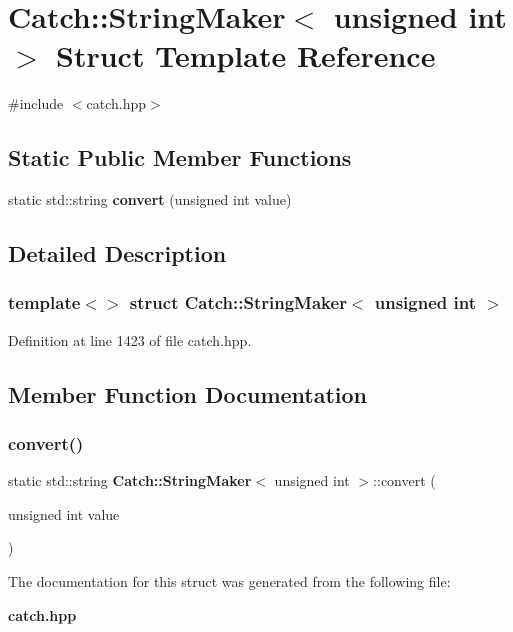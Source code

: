 \section{Catch\+::String\+Maker$<$ unsigned int $>$ Struct Template Reference}
\label{struct_catch_1_1_string_maker_3_01unsigned_01int_01_4}


{\ttfamily \#include $<$catch.\+hpp$>$}

\subsection*{Static Public Member Functions}
\begin{DoxyCompactItemize}
\item 
static std\+::string \textbf{ convert} (unsigned int value)
\end{DoxyCompactItemize}


\subsection{Detailed Description}
\subsubsection*{template$<$$>$\newline
struct Catch\+::\+String\+Maker$<$ unsigned int $>$}



Definition at line 1423 of file catch.\+hpp.



\subsection{Member Function Documentation}
\mbox{\label{struct_catch_1_1_string_maker_3_01unsigned_01int_01_4_aa0ec816ef8a65664b0524d55d08e2fd9}} 
\subsubsection{convert()}
{\footnotesize\ttfamily static std\+::string \textbf{ Catch\+::\+String\+Maker}$<$ unsigned int $>$\+::convert (\begin{DoxyParamCaption}\item[{unsigned int}]{value }\end{DoxyParamCaption})\hspace{0.3cm}{\ttfamily [static]}}



The documentation for this struct was generated from the following file\+:\begin{DoxyCompactItemize}
\item 
\textbf{ catch.\+hpp}\end{DoxyCompactItemize}

